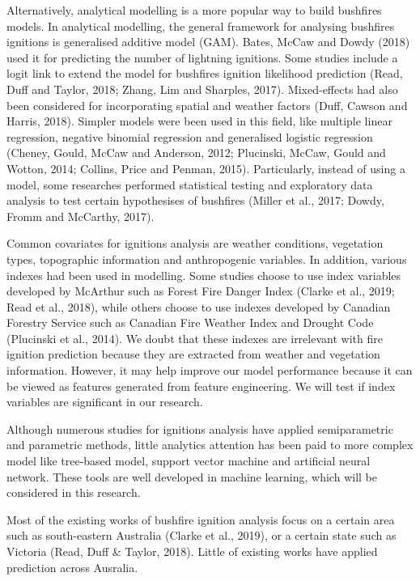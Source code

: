 \documentclass{monashthesis}
\begin{document}
Alternatively, analytical modelling is a more popular way to build
bushfires models. In analytical modelling, the general framework for
analysing bushfires ignitions is generalised additive model (GAM).
Bates, McCaw and Dowdy (2018) used it for predicting the number of
lightning ignitions. Some studies include a logit link to extend the
model for bushfires ignition likelihood prediction (Read, Duff and
Taylor, 2018; Zhang, Lim and Sharples, 2017). Mixed-effects had also
been considered for incorporating spatial and weather factors (Duff,
Cawson and Harris, 2018). Simpler models were been used in this field,
like multiple linear regression, negative binomial regression and
generalised logistic regression (Cheney, Gould, McCaw and Anderson,
2012; Plucinski, McCaw, Gould and Wotton, 2014; Collins, Price and
Penman, 2015). Particularly, instead of using a model, some researches
performed statistical testing and exploratory data analysis to test
certain hypothesises of bushfires (Miller et al., 2017; Dowdy, Fromm and
McCarthy, 2017).

Common covariates for ignitions analysis are weather conditions,
vegetation types, topographic information and anthropogenic variables.
In addition, various indexes had been used in modelling. Some studies
choose to use index variables developed by McArthur such as Forest Fire
Danger Index (Clarke et al., 2019; Read et al., 2018), while others
choose to use indexes developed by Canadian Forestry Service such as
Canadian Fire Weather Index and Drought Code (Plucinski et al., 2014).
We doubt that these indexes are irrelevant with fire ignition prediction
because they are extracted from weather and vegetation information.
However, it may help improve our model performance because it can be
viewed as features generated from feature engineering. We will test if
index variables are significant in our research.

Although numerous studies for ignitions analysis have applied
semiparametric and parametric methods, little analytics attention has
been paid to more complex model like tree-based model, support vector
machine and artificial neural network. These tools are well developed in
machine learning, which will be considered in this research.

Most of the existing works of bushfire ignition analysis focus on a
certain area such as south-eastern Australia (Clarke et al., 2019), or a
certain state such as Victoria (Read, Duff \& Taylor, 2018). Little of
existing works have applied prediction across Ausralia.
\end{document}

